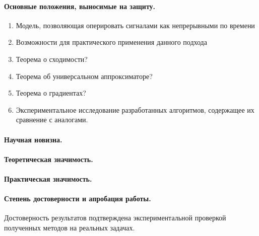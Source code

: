 \documentclass[12pt]{article}
\begin{document}
\paragraph{Основные положения, выносимые на защиту.}
\begin{enumerate}
  \item Модель, позволяющая оперировать сигналами как непрерывными по времени
  \item Возможности для практического применения данного подхода
  \item Теорема о сходимости?
  \item Теорема об универсальном аппроксиматоре?
  \item Теорема о градиентах?
  \item Экспериментальное исследование разработанных алгоритмов, содержащее их сравнение с аналогами.
\end{enumerate}

\paragraph{Научная новизна.}

\paragraph{Теоретическая значимость.}

\paragraph{Практическая значимость.}


\paragraph{Степень достоверности и апробация работы.}
Достоверность результатов подтверждена экспериментальной проверкой полученных методов на реальных задачах.
\end{document}
